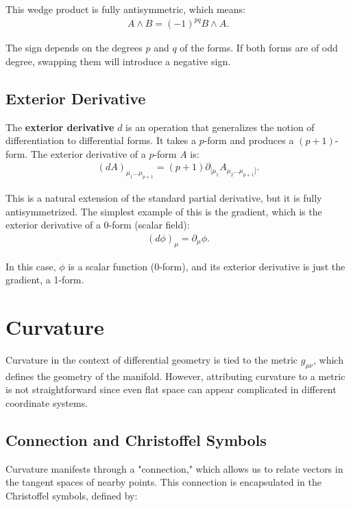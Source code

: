 \documentclass[12pt]{book}
\begin{document}
This wedge product is fully antisymmetric, which means:
\begin{align}
A \wedge B = (-1)^{pq} B \wedge A.
\end{align}


The sign depends on the degrees \( p \) and \( q \) of the forms. If both forms are of odd degree, swapping them will introduce a negative sign.

\subsection{Exterior Derivative}

The \textbf{exterior derivative} \( d \) is an operation that generalizes the notion of differentiation to differential forms. It takes a \( p \)-form and produces a \( (p+1) \)-form. The exterior derivative of a \( p \)-form \( A \) is:
\begin{align}
(dA)_{\mu_1 \dots \mu_{p+1}} = (p+1) \partial_{[\mu_1} A_{\mu_2 \dots \mu_{p+1}]}.
\end{align}

This is a natural extension of the standard partial derivative, but it is fully antisymmetrized. The simplest example of this is the gradient, which is the exterior derivative of a 0-form (scalar field):
\begin{align}
(d\phi)_\mu = \partial_\mu \phi.
\end{align}

In this case, \( \phi \) is a scalar function (0-form), and its exterior derivative is just the gradient, a 1-form.





\section{Curvature}
Curvature in the context of differential geometry is tied to the metric \(g_{\mu\nu}\), which defines the geometry of the manifold. However, attributing curvature to a metric is not straightforward since even flat space can appear complicated in different coordinate systems.

\subsection{Connection and Christoffel Symbols}
Curvature manifests through a "connection," which allows us to relate vectors in the tangent spaces of nearby points. This connection is encapsulated in the Christoffel symbols, defined by:
\end{document}
